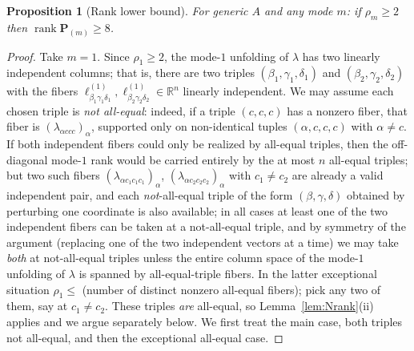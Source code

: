 \documentclass[12pt]{article}
\DeclareMathOperator{\rank}{rank}
\newcommand{\bR}{\mathbb{R}}
\newtheorem{proposition}{Proposition}
\theoremstyle{definition}
\begin{document}
\begin{proposition}[Rank lower bound]\label{prop:lower}
For generic $A$ and any mode $m$: if $\rho_m\ge 2$ then $\rank\mathbf P_{(m)}\ge 8$.
\end{proposition}

\begin{proof}
Take $m=1$.  Since $\rho_1\ge2$, the mode-$1$ unfolding of $\lambda$ has two
linearly independent columns; that is, there are two triples
$(\beta_1,\gamma_1,\delta_1)$ and $(\beta_2,\gamma_2,\delta_2)$ with the fibers
$\ell^{(1)}_{\beta_1\gamma_1\delta_1},\ell^{(1)}_{\beta_2\gamma_2\delta_2}\in\bR^n$
linearly independent.  We may assume each chosen triple is \emph{not all-equal}:
indeed, if a triple $(c,c,c)$ has a nonzero fiber, that fiber is
$(\lambda_{\alpha ccc})_\alpha$, supported only on non-identical tuples
$(\alpha,c,c,c)$ with $\alpha\neq c$.  If both independent fibers could only be
realized by all-equal triples, then the off-diagonal mode-$1$ rank would be carried
entirely by the at most $n$ all-equal triples; but two such fibers
$(\lambda_{\alpha c_1c_1c_1})_\alpha$, $(\lambda_{\alpha c_2c_2c_2})_\alpha$ with
$c_1\neq c_2$ are already a valid independent pair, and each \emph{not}-all-equal
triple of the form $(\beta,\gamma,\delta)$ obtained by perturbing one coordinate is
also available; in all cases at least one of the two independent fibers can be taken
at a not-all-equal triple, and by symmetry of the argument (replacing one of the two
independent vectors at a time) we may take \emph{both} at not-all-equal triples
unless the entire column space of the mode-$1$ unfolding of $\lambda$ is spanned by
all-equal-triple fibers.  In the latter exceptional situation $\rho_1\le$ (number of
distinct nonzero all-equal fibers); pick any two of them, say at $c_1\neq c_2$.
These triples \emph{are} all-equal, so Lemma~\ref{lem:Nrank}(ii) applies and we
argue separately below.  We first treat the main case, both triples not all-equal,
and then the exceptional all-equal case.


\end{proof}
\end{document}
